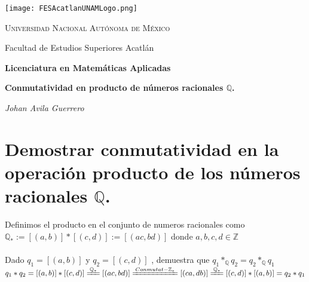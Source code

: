 \documentclass[a4paper,12pt]{article}
\begin{document}
\begin{titlepage}
    \centering
    \texttt{[image: FESAcatlanUNAMLogo.png]} %
    \vspace{1cm}
    
    {\scshape\large Universidad Nacional Autónoma de México \par}
    {\large Facultad de Estudios Superiores Acatlán \par}
    \vspace{1.5cm}
    
    {\Large\bfseries Licenciatura en Matemáticas Aplicadas \par}
    \vspace{2cm}
    
    {\Huge\bfseries  Conmutatividad en producto de números racionales \(\mathbb{Q}\).

    \par}
    \vspace{2cm}
    
    {\Large\itshape Johan Avila Guerrero \par}
    \vfill
    
    
    \vfill
    
\end{titlepage}



\section*{Demostrar conmutatividad en la operación producto de los números racionales \(\mathbb{Q}\).}
\noindent  Definimos el producto en el conjunto de numeros racionales como \(\mathbb{Q}_{*} := [(a,b)] * [(c,d)] := [(ac , bd)] \) donde \(a,b,c,d \in \mathbb{Z}\)  \\ \\


Dado \(q_{1} = [(a,b)]\) y \(q_{2} = [(c,d)]\) , demuestra que \( q_{1}  *_{\mathbb{Q}}  q_{2} =  q_{2}*_{\mathbb{Q}} q_{1}    \) \\

\(q_{1} * q_{2}   =  [(a,b)] * [(c,d)] \xlongequal[]{ \mathbb{Q}_{*}} [(ac, bd)] \xlongequal[]{ Conmutat-\mathbb{Z}_{*}}   [(ca, db)] \xlongequal[]{ \mathbb{Q}_{*}} [(c,d)] * [(a,b)] = q_{2}*q_{1} \)
\end{document}
